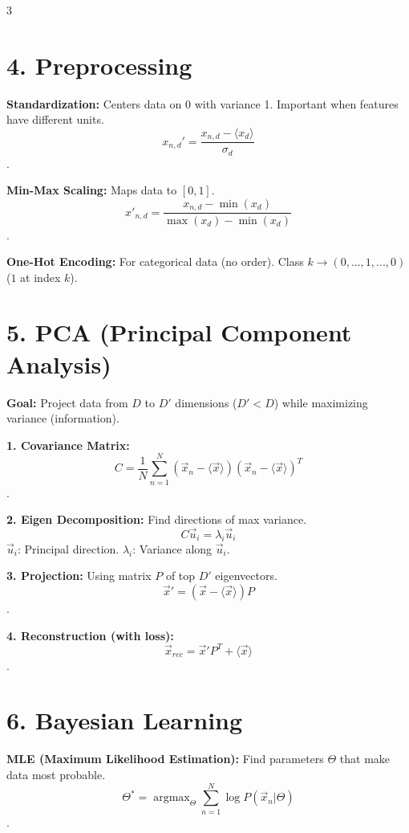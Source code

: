 \documentclass[10pt, a4paper, landscape]{article}
\begin{document}
\begin{multicols*}{3}
\section{4. Preprocessing}
\textbf{Standardization:} Centers data on 0 with variance 1.
Important when features have different units.
$$ x_{n,d}' = \frac{x_{n,d} - \langle x_d \rangle}{\sigma_d} $$
.

\textbf{Min-Max Scaling:} Maps data to $[0, 1]$.
$$ x'_{n,d} = \frac{x_{n,d} - \min(x_d)}{\max(x_d) - \min(x_d)} $$
.

\textbf{One-Hot Encoding:} For categorical data (no order).
Class $k \to (0, ..., 1, ..., 0)$ ($1$ at index $k$).

\section{5. PCA (Principal Component Analysis)}
\textbf{Goal:} Project data from $D$ to $D'$ dimensions ($D' < D$) while maximizing variance (information).

\textbf{1. Covariance Matrix:}
$$ C = \frac{1}{N} \sum_{n=1}^N (\vec{x}_n - \langle \vec{x} \rangle)(\vec{x}_n - \langle \vec{x} \rangle)^T $$
.

\textbf{2. Eigen Decomposition:} Find directions of max variance.
$$ C \vec{u}_i = \lambda_i \vec{u}_i $$
$\vec{u}_i$: Principal direction. $\lambda_i$: Variance along $\vec{u}_i$.

\textbf{3. Projection:} Using matrix $P$ of top $D'$ eigenvectors.
$$ \vec{x}' = (\vec{x} - \langle \vec{x} \rangle) P $$
.

\textbf{4. Reconstruction (with loss):}
$$ \vec{x}_{rec} = \vec{x}' P^T + \langle \vec{x} \rangle $$
.

\section{6. Bayesian Learning}
\textbf{MLE (Maximum Likelihood Estimation):}
Find parameters $\Theta$ that make data most probable.
$$ \Theta^* = \operatorname{argmax}_\Theta \sum_{n=1}^N \log P(\vec{x}_n | \Theta) $$
.


\end{multicols*}
\end{document}
